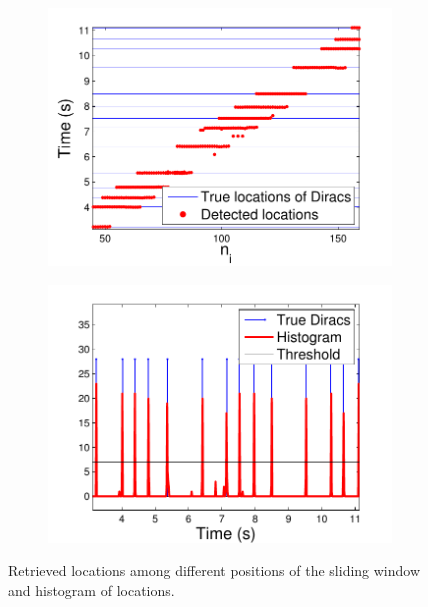 \documentclass[8pt]{beamer}
\begin{document}
\begin{frame}
\begin{itemize}
\begin{figure}[h]
\begin{subfigure}{.3\textwidth}
\includegraphics[width=\linewidth]{figures/noisy_scatter}
\end{subfigure}
\begin{subfigure}{.3\textwidth}
\includegraphics[width=\linewidth]{figures/noisy_histogram}
\end{subfigure}
\caption{Retrieved locations among different positions of the sliding window and histogram
of locations.}
\end{figure}

\end{itemize}

\end{frame}
\end{document}
